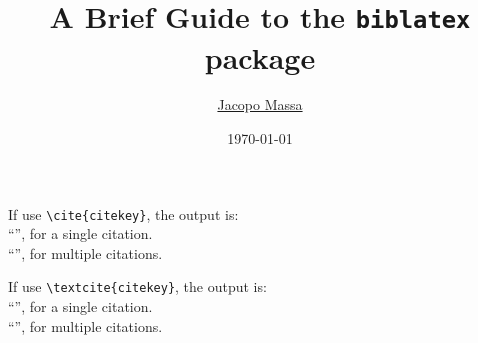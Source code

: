 \documentclass{article}
\title{A Brief Guide to the \texttt{biblatex} package}
\author{\href{https://pages.di.unipi.it/massa}{Jacopo Massa}}
\date{\today}
\begin{document}
If use \verb!\cite{citekey}!, the output is:\\
``\cite{massa2022daplacer}'', for a single citation.\\
``\cite{massa2022daplacer,forti2022fogbrain}'', for multiple citations.

\vspace{1cm}

If use \verb!\textcite{citekey}!, the output is:\\
``\textcite{massa2022daplacer}'', for a single citation.\\
``\textcite{massa2022daplacer,forti2022fogbrain}'', for multiple citations.

\AtNextBibliography{\footnotesize}
\printbibliography[heading=bibintoc]
\end{document}
